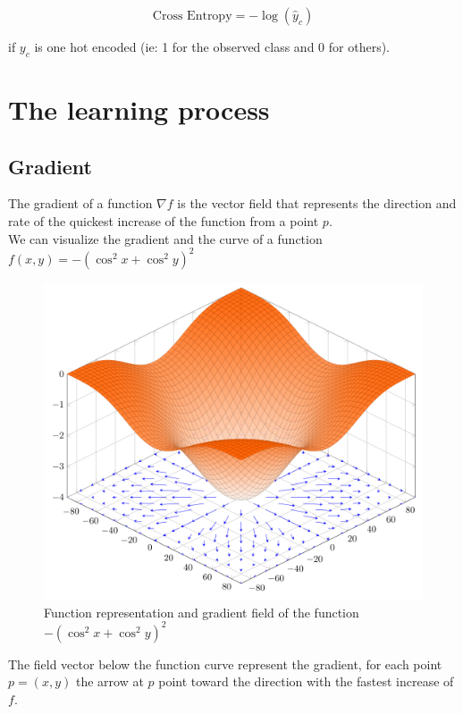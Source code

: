\documentclass[a4paper, twocolumn, twoside]{article}
\begin{document}
	$$
		\text{Cross Entropy} = -\log(\hat{y}_{c})
	$$

	if $y_{c}$ is one hot encoded (ie: 1 for the observed class and 0 for others).

	\section{The learning process}
	\subsection{Gradient}
	The gradient of a function $\nabla f$ is the vector field that represents the direction
	and rate of the quickest increase of the function from a point $p$.\\
	We can visualize the gradient and the curve of a function $f(x, y) = -(\cos^2 x  +\cos^2 y)^2$\\

	\begin{figure}[H]
		\begin{center}
			\includegraphics[width=\columnwidth]{images/gradient_2d.png}
		\end{center}
		\caption{Function representation and gradient field of the function $-(\cos^2 x  +\cos^2 y)^2$}\label{fig:gradien2d}
	\end{figure}

	The field vector below the function curve represent the gradient,
	for each point $p = (x, y)$ the arrow at $p$ point toward the direction
	with the fastest increase of $f$.
\end{document}
